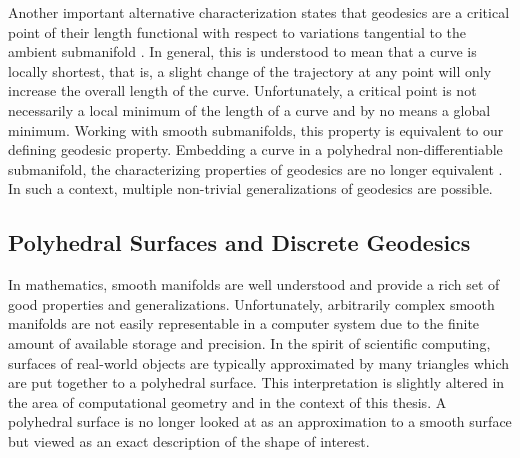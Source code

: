 \documentclass{stdlocal}
\begin{document}
  Another important alternative characterization states that geodesics are a critical point of their length functional with respect to variations tangential to the ambient submanifold \autocite{polthier2006}.
  In general, this is understood to mean that a curve is locally shortest, that is, a slight change of the trajectory at any point will only increase the overall length of the curve.
  Unfortunately, a critical point is not necessarily a local minimum of the length of a curve and by no means a global minimum.
  Working with smooth submanifolds, this property is equivalent to our defining geodesic property.
  Embedding a curve in a polyhedral non-differentiable submanifold, the characterizing properties of geodesics are no longer equivalent \autocite{polthier2006}.
  In such a context, multiple non-trivial generalizations of geodesics are possible.





\subsection{Polyhedral Surfaces and Discrete Geodesics} %
\label{sub:polyhedral_surfaces}

  In mathematics, smooth manifolds are well understood and provide a rich set of good properties and generalizations.
  Unfortunately, arbitrarily complex smooth manifolds are not easily representable in a computer system due to the finite amount of available storage and precision.
  In the spirit of scientific computing, surfaces of real-world objects are typically approximated by many triangles which are put together to a polyhedral surface.
  This interpretation is slightly altered in the area of computational geometry and in the context of this thesis.
  A polyhedral surface is no longer looked at as an approximation to a smooth surface but viewed as an exact description of the shape of interest.
  \autocite{sharp2020}
\end{document}
